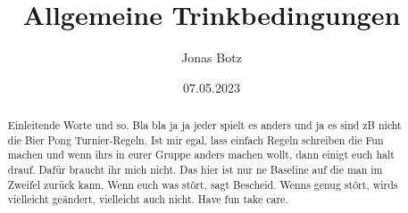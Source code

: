 \documentclass{article}
\title{Allgemeine Trinkbedingungen}
\author{Jonas Botz}
\date{07.05.2023}
\begin{document}
\maketitle
\begin{abstract}
    Einleitende Worte und so. Bla bla ja ja jeder spielt es anders und ja es sind zB nicht die Bier Pong Turnier-Regeln. Ist mir egal, lass einfach Regeln schreiben die Fun machen und wenn ihrs in eurer Gruppe anders machen wollt, dann einigt euch halt drauf. Dafür braucht ihr mich nicht. Das hier ist nur ne Baseline auf die man im Zweifel zurück kann. Wenn euch was stört, sagt Bescheid. Wenns genug stört, wirds vielleicht geändert, vielleicht auch nicht. Have fun take care.
\end{abstract}











\end{document}
